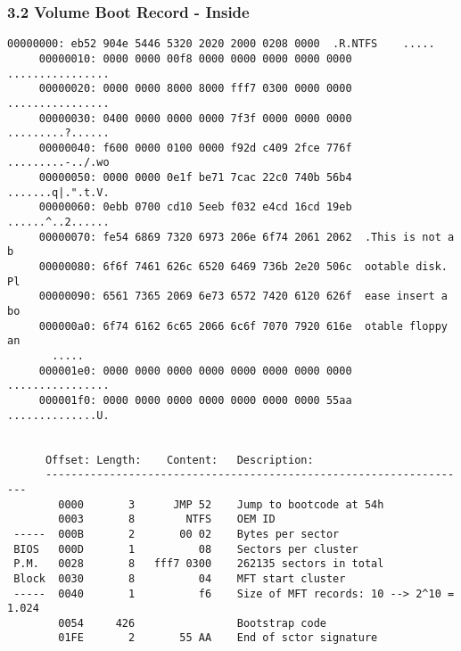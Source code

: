 \begin{frame}[fragile]
  \frametitle{3.2 Volume Boot Record - Inside}
  \begin{lstlisting}[basicstyle=\tiny]
     00000000: eb52 904e 5446 5320 2020 2000 0208 0000  .R.NTFS    .....
     00000010: 0000 0000 00f8 0000 0000 0000 0000 0000  ................
     00000020: 0000 0000 8000 8000 fff7 0300 0000 0000  ................
     00000030: 0400 0000 0000 0000 7f3f 0000 0000 0000  .........?......
     00000040: f600 0000 0100 0000 f92d c409 2fce 776f  .........-../.wo
     00000050: 0000 0000 0e1f be71 7cac 22c0 740b 56b4  .......q|.".t.V.
     00000060: 0ebb 0700 cd10 5eeb f032 e4cd 16cd 19eb  ......^..2......
     00000070: fe54 6869 7320 6973 206e 6f74 2061 2062  .This is not a b
     00000080: 6f6f 7461 626c 6520 6469 736b 2e20 506c  ootable disk. Pl
     00000090: 6561 7365 2069 6e73 6572 7420 6120 626f  ease insert a bo
     000000a0: 6f74 6162 6c65 2066 6c6f 7070 7920 616e  otable floppy an
       .....
     000001e0: 0000 0000 0000 0000 0000 0000 0000 0000  ................
     000001f0: 0000 0000 0000 0000 0000 0000 0000 55aa  ..............U.


      Offset: Length:    Content:   Description:
      -------------------------------------------------------------------
        0000       3      JMP 52    Jump to bootcode at 54h
        0003       8        NTFS    OEM ID
 -----  000B       2       00 02    Bytes per sector
 BIOS   000D       1          08    Sectors per cluster
 P.M.   0028       8   fff7 0300    262135 sectors in total
 Block  0030       8          04    MFT start cluster
 -----  0040       1          f6    Size of MFT records: 10 --> 2^10 = 1.024
        0054     426                Bootstrap code
        01FE       2       55 AA    End of sctor signature
  \end{lstlisting}
\end{frame}


